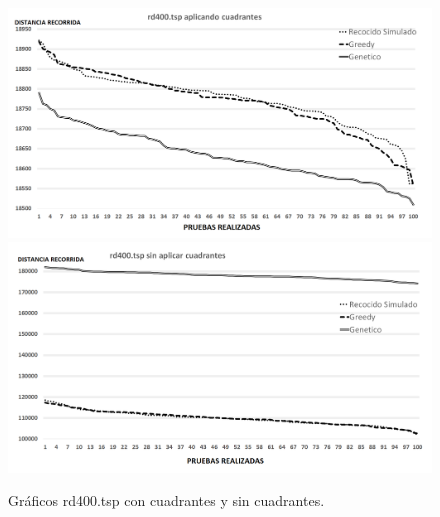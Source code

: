  \begin{figure}[hbtp]
    \centering
        \includegraphics[width=1\textwidth]{PruebasResultados/Experimentos_Graficos_Con/rd400.png}
        \includegraphics[width=1\textwidth]{PruebasResultados/Experimentos_Graficos_Sin/rd400.png}
        \caption{Gráficos rd400.tsp con cuadrantes y sin cuadrantes.}
        \label{fig:rd400_grafica.png}
\end{figure}
\newpage


